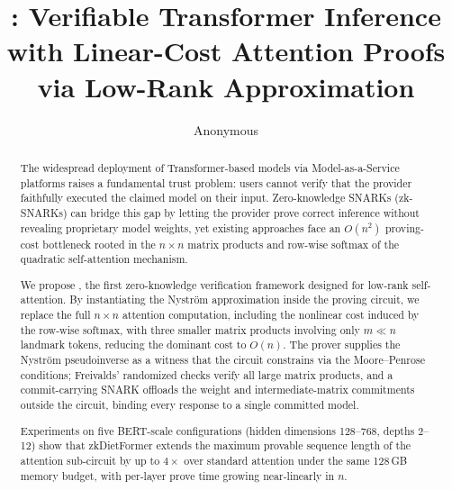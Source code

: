 \documentclass[runningheads]{llncs}
\begin{document}
\title{\name: Verifiable Transformer Inference with Linear-Cost Attention Proofs via Low-Rank Approximation}

\author{Anonymous}


\institute{}

\maketitle

\begin{abstract}
The widespread deployment of Transformer-based models via Model-as-a-Service platforms raises a fundamental trust problem: users cannot verify that the provider faithfully executed the claimed model on their input. Zero-knowledge SNARKs (zk-SNARKs) can bridge this gap by letting the provider prove correct inference without revealing proprietary model weights, yet existing approaches face an $O(n^2)$ proving-cost bottleneck rooted in the $n\times n$ matrix products and row-wise softmax of the quadratic self-attention mechanism.
    
We propose \name, the first zero-knowledge verification framework designed for low-rank self-attention. By instantiating the Nystr\"{o}m approximation inside the proving circuit, we replace the full $n \times n$ attention computation, including the nonlinear cost induced by the row-wise softmax, with three smaller matrix products involving only $m \ll n$ landmark tokens, reducing the dominant cost to $O(n)$. The prover supplies the Nystr\"{o}m pseudoinverse as a witness that the circuit constrains via the Moore--Penrose conditions; Freivalds' randomized checks verify all large matrix products, and a commit-carrying SNARK offloads the weight and intermediate-matrix commitments outside the circuit, binding every response to a single committed model.
    
Experiments on five BERT-scale configurations (hidden dimensions 128--768, depths 2--12) show that zkDietFormer extends the maximum provable sequence length of the attention sub-circuit by up to $4\times$ over standard attention under the same 128\,GB memory budget, with per-layer prove time growing near-linearly in $n$. %
    
\end{abstract}
\end{document}
